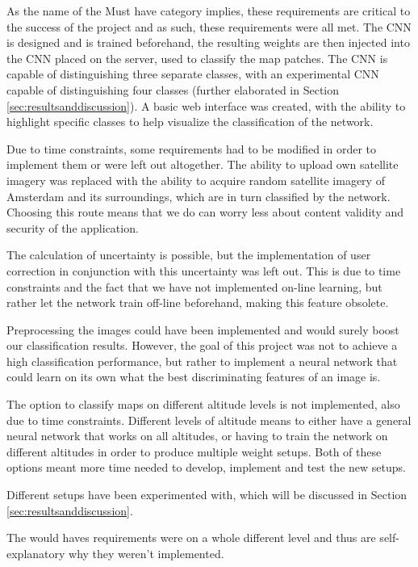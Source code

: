\documentclass[a4paper,onecolumn]{report}
\begin{document}
As the name of the Must have category implies, these requirements are critical to the success of the project and as such, these requirements were all met. The CNN is designed and is trained beforehand, the resulting weights are then injected into the CNN placed on the server, used to classify the map patches. The CNN is capable of distinguishing three separate classes, with an experimental CNN capable of distinguishing four classes (further elaborated in Section \ref{sec:resultsanddiscussion}).
A basic web interface was created, with the ability to highlight specific classes to help visualize the classification of the network.

Due to time constraints, some requirements had to be modified in order to implement them or were left out altogether. The ability to upload own satellite imagery was replaced with the ability to acquire random satellite imagery of Amsterdam and its surroundings, which are in turn classified by the network. Choosing this route means that we do can worry less about content validity and security of the application.

The calculation of uncertainty is possible, but the implementation of user correction in conjunction with this uncertainty was left out. This is due to time constraints and the fact that we have not implemented on-line learning, but rather let the network train off-line beforehand, making this feature obsolete.

Preprocessing the images could have been implemented and would surely boost our classification results. However, the goal of this project was not to achieve a high classification performance, but rather to implement a neural network that could learn on its own what the best discriminating features of an image is.

The option to classify maps on different altitude levels is not implemented, also due to time constraints. Different levels of altitude means to either have a general neural network that works on all altitudes, or having to train the network on different altitudes in order to produce multiple weight setups. Both of these options meant more time needed to develop, implement and test the new setups. 

Different setups have been experimented with, which will be discussed in Section \ref{sec:resultsanddiscussion}.

The would haves requirements were on a whole different level and thus are self-explanatory why they weren't implemented.
\end{document}
